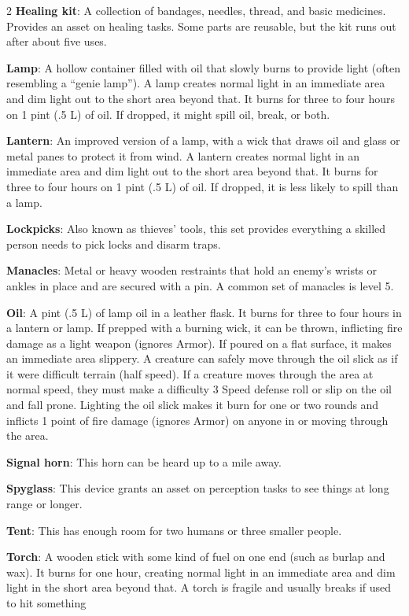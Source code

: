 \begin{multicols}{2}
\textbf{Healing kit}: A collection of bandages, needles, thread, and basic medicines. Provides an asset on healing tasks. Some parts are reusable, but the kit runs out after about five uses. 

\textbf{Lamp}: A hollow container filled with oil that slowly burns to provide light (often resembling a “genie lamp”). A lamp creates normal light in an immediate area and dim light out to the short area beyond that. It burns for three to four hours on 1 pint (.5 L) of oil. If dropped, it might spill oil, break, or both. 

\textbf{Lantern}: An improved version of a lamp, with a wick that draws oil and glass or metal panes to protect it from wind. A lantern creates normal light in an immediate area and dim light out to the short area beyond that. It burns for three to four hours on 1 pint (.5 L) of oil. If dropped, it is less likely to spill than a lamp.

\textbf{Lockpicks}: Also known as thieves’ tools, this set provides everything a skilled person needs to pick locks and disarm traps. 

\textbf{Manacles}: Metal or heavy wooden restraints that hold an enemy’s wrists or ankles in place and are secured with a pin. A common set of manacles is level 5. 

\textbf{Oil}: A pint (.5 L) of lamp oil in a leather flask. It burns for three to four hours in a lantern or lamp. If prepped with a burning wick, it can be thrown, inflicting fire damage as a light weapon (ignores Armor). If poured on a flat surface, it makes an immediate area slippery. A creature can safely move through the oil slick as if it were difficult terrain (half speed). If a creature moves through the area at normal speed, they must make a difficulty 3 Speed defense roll or slip on the oil and fall prone. Lighting the oil slick makes it burn for one or two rounds and inflicts 1 point of fire damage (ignores Armor) on anyone in or moving through the area. 

\textbf{Signal horn}: This horn can be heard up to a mile away. 

\textbf{Spyglass}: This device grants an asset on perception tasks to see things at long range or longer. 

\textbf{Tent}: This has enough room for two humans or three smaller people. 

\textbf{Torch}: A wooden stick with some kind of fuel on one end (such as burlap and wax). It burns for one hour, creating normal light in an immediate area and dim light in the short area beyond that. A torch is fragile and usually breaks if used to hit something

\end{multicols}

